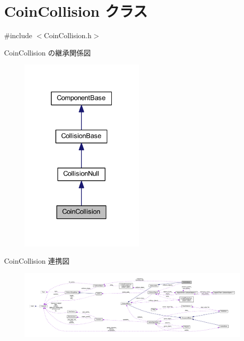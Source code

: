 \hypertarget{class_coin_collision}{}\section{Coin\+Collision クラス}
\label{class_coin_collision}


{\ttfamily \#include $<$Coin\+Collision.\+h$>$}



Coin\+Collision の継承関係図\nopagebreak
\begin{figure}[H]
\begin{center}
\leavevmode
\includegraphics[width=169pt]{class_coin_collision__inherit__graph}
\end{center}
\end{figure}


Coin\+Collision 連携図\nopagebreak
\begin{figure}[H]
\begin{center}
\leavevmode
\includegraphics[width=350pt]{class_coin_collision__coll__graph}
\end{center}
\end{figure}
